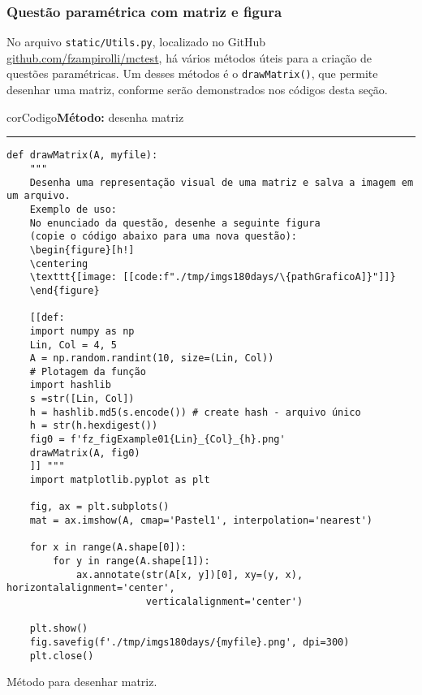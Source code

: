 \subsubsection{Questão paramétrica com matriz e figura}

No arquivo \verb|static/Utils.py|, localizado no GitHub \href{https://github.com/fzampirolli/mctest}{github.com/fzampirolli/mctest}, há vários métodos úteis para a criação de questões paramétricas. Um desses métodos é o \texttt{drawMatrix()}, que permite desenhar uma matriz, conforme serão demonstrados nos códigos desta seção.

\begin{listing}[!ht]
\begin{myboxCode}{corCodigo}{\textbf{Método: } desenha matriz}\vspace{3mm}
\hrule
\begin{verbatim}
def drawMatrix(A, myfile):
    """
    Desenha uma representação visual de uma matriz e salva a imagem em um arquivo.
    Exemplo de uso:
    No enunciado da questão, desenhe a seguinte figura 
    (copie o código abaixo para uma nova questão):
    \begin{figure}[h!]
    \centering
    \texttt{[image: [[code:f"./tmp/imgs180days/\{pathGraficoA]}"]]} 
    \end{figure}

    [[def:
    import numpy as np
    Lin, Col = 4, 5
    A = np.random.randint(10, size=(Lin, Col))
    # Plotagem da função
    import hashlib
    s =str([Lin, Col]) 
    h = hashlib.md5(s.encode()) # create hash - arquivo único
    h = str(h.hexdigest())
    fig0 = f'fz_figExample01{Lin}_{Col}_{h}.png'    
    drawMatrix(A, fig0)
    ]] """
    import matplotlib.pyplot as plt

    fig, ax = plt.subplots()
    mat = ax.imshow(A, cmap='Pastel1', interpolation='nearest')

    for x in range(A.shape[0]):
        for y in range(A.shape[1]):
            ax.annotate(str(A[x, y])[0], xy=(y, x), horizontalalignment='center', 
                        verticalalignment='center')

    plt.show()
    fig.savefig(f'./tmp/imgs180days/{myfile}.png', dpi=300)
    plt.close()
\end{verbatim}
\end{myboxCode}
\caption{Método para desenhar matriz.}
\label{lst:questaoDesenhaMatriz}
\end{listing}

